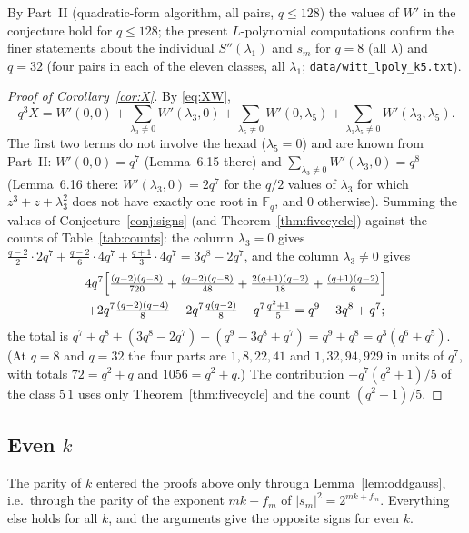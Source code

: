 \documentclass[12pt,a4paper]{amsart}
\theoremstyle{definition}
\newcommand{\F}{\mathbb{F}}
\newcommand{\Spp}{S''}
\begin{document}
By Part~II (quadratic-form algorithm, all pairs, $q\le128$) the values of $W'$ in the conjecture hold for $q\le128$; the present $L$-polynomial computations confirm the finer statements about the individual $\Spp(\lambda_1)$ and $s_m$ for $q=8$ (all $\lambda$) and $q=32$ (four pairs in each of the eleven classes, all $\lambda_1$; \texttt{data/witt\_lpoly\_k5.txt}).

\begin{proof}[Proof of Corollary~\ref{cor:X}]
By \eqref{eq:XW},
\[
q^3X=W'(0,0)+\sum_{\lambda_3\ne0}W'(\lambda_3,0)+\sum_{\lambda_5\ne0}W'(0,\lambda_5)+\sum_{\lambda_3\lambda_5\ne0}W'(\lambda_3,\lambda_5).
\]
The first two terms do not involve the hexad ($\lambda_5=0$) and are known from Part~II: $W'(0,0)=q^7$ (Lemma~6.15 there) and $\sum_{\lambda_3\ne0}W'(\lambda_3,0)=q^8$ (Lemma~6.16 there: $W'(\lambda_3,0)=2q^7$ for the $q/2$ values of $\lambda_3$ for which $z^3+z+\lambda_3^2$ does not have exactly one root in $\F_q$, and $0$ otherwise). Summing the values of Conjecture~\ref{conj:signs} (and Theorem~\ref{thm:fivecycle}) against the counts of Table~\ref{tab:counts}: the column $\lambda_3=0$ gives $\frac{q-2}2\cdot2q^7+\frac{q-2}6\cdot4q^7+\frac{q+1}3\cdot4q^7=3q^8-2q^7$, and the column $\lambda_3\ne0$ gives
\begin{multline*}
4q^7\Bigl[\tfrac{(q-2)(q-8)}{720}+\tfrac{(q-2)(q-8)}{48}+\tfrac{2(q+1)(q-2)}{18}+\tfrac{(q+1)(q-2)}6\Bigr]\\
+2q^7\tfrac{(q-2)(q-4)}8-2q^7\tfrac{q(q-2)}8-q^7\tfrac{q^2+1}5=q^9-3q^8+q^7 ;
\end{multline*}
the total is $q^7+q^8+(3q^8-2q^7)+(q^9-3q^8+q^7)=q^9+q^8=q^3(q^6+q^5)$. (At $q=8$ and $q=32$ the four parts are $1,8,22,41$ and $1,32,94,929$ in units of $q^7$, with totals $72=q^2+q$ and $1056=q^2+q$.) The contribution $-q^7(q^2+1)/5$ of the class $5\,1$ uses only Theorem~\ref{thm:fivecycle} and the count $(q^2+1)/5$.
\end{proof}

\subsection{Even \texorpdfstring{$k$}{k}}\label{subsec:evenk}
The parity of $k$ entered the proofs above only through Lemma~\ref{lem:oddgauss}, i.e.\ through the parity of the exponent $mk+f_m$ of $|s_m|^2=2^{mk+f_m}$. Everything else holds for all $k$, and the arguments give the opposite signs for even $k$.
\end{document}
